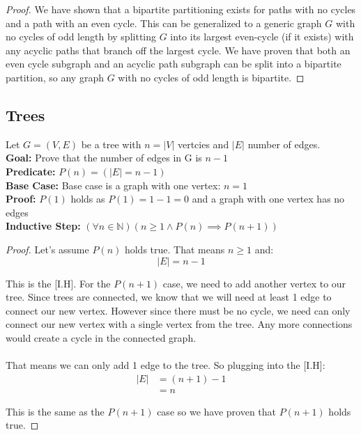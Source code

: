 \documentclass{article}
\begin{document}
\begin{enumerate}[label=(\alph*)]
\begin{proof}
            We have shown that a bipartite partitioning exists for paths with no cycles and a path with an even cycle. This can be generalized to a generic graph \(G\) with no cycles of odd length by splitting \(G\) into its largest even-cycle (if it exists) with any acyclic paths that branch off the largest cycle. We have proven that both an even cycle subgraph and an acyclic path subgraph can be split into a bipartite partition, so any graph \(G\) with no cycles of odd length is bipartite.
        \end{proof}
    
\end{enumerate}
\newpage

\subsection{Trees}
    Let \(G = (V,E)\) be a tree with \(n = |V|\) vertcies and \(|E|\) number of edges.\\
    \textbf{Goal:} Prove that the number of edges in G is \(n-1\)\\
    \textbf{Predicate:} \(P(n) = (|E| = n-1)\) \\
    \textbf{Base Case:} Base case is a graph with one vertex: \(n=1\) \\
    \textbf{Proof:} \(P(1)\) holds as \(P(1) = 1-1 = 0\) and a graph with one vertex has no edges\\
    \textbf{Inductive Step:} \((\forall n \in \mathbb{N}) (n \geq 1 \land P(n) \implies P(n+1))\)
    \begin{proof}
        Let's assume \(P(n)\) holds true. That means \(n \geq 1\) and:
        \begin{displaymath}
            |E| = n - 1
        \end{displaymath}
        
        This is the [I.H]. For the \(P(n+1)\) case, we need to add another vertex to our tree. Since trees are connected, we know that we will need at least 1 edge to connect our new vertex. However since there must be no cycle, we need can only connect our new vertex with a single vertex from the tree. Any more connections would create a cycle in the connected graph. \\\\
        
        That means we can only add 1 edge to the tree. So plugging into the [I.H]:
        \begin{align*}
            |E| &= (n + 1) - 1 \\
            &= n
        \end{align*}
        
        This is the same as the \(P(n+1)\) case so we have proven that \(P(n+1)\) holds true.
    \end{proof}
\newpage
\end{document}
